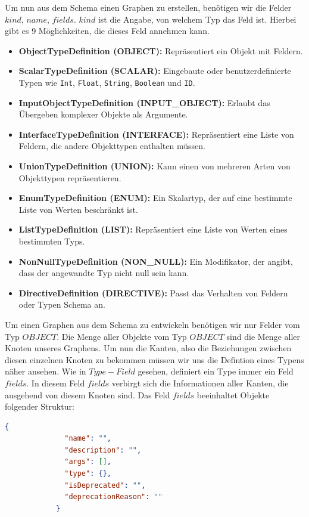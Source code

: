 Um nun aus dem Schema einen Graphen zu erstellen, benötigen wir die Felder $kind$, $name$, $fields$.
$kind$ ist die Angabe, von welchem Typ das Feld ist.
Hierbei gibt es 9 Möglichkeiten, die dieses Feld annehmen kann.

\begin{itemize}
    \item \textbf{ObjectTypeDefinition (OBJECT):} Repräsentiert ein Objekt mit Feldern.
    \item \textbf{ScalarTypeDefinition (SCALAR):} Eingebaute oder benutzerdefinierte Typen wie \texttt{Int}, \texttt{Float}, \texttt{String}, \texttt{Boolean} und \texttt{ID}.
    \item \textbf{InputObjectTypeDefinition (INPUT\_OBJECT):} Erlaubt das Übergeben komplexer Objekte als Argumente.
    \item \textbf{InterfaceTypeDefinition (INTERFACE):} Repräsentiert eine Liste von Feldern, die andere Objekttypen enthalten müssen.
    \item \textbf{UnionTypeDefinition (UNION):} Kann einen von mehreren Arten von Objekttypen repräsentieren.
    \item \textbf{EnumTypeDefinition (ENUM):} Ein Skalartyp, der auf eine bestimmte Liste von Werten beschränkt ist.
    \item \textbf{ListTypeDefinition (LIST):} Repräsentiert eine Liste von Werten eines bestimmten Typs.
    \item \textbf{NonNullTypeDefinition (NON\_NULL):} Ein Modifikator, der angibt, dass der angewandte Typ nicht null sein kann.
    \item \textbf{DirectiveDefinition (DIRECTIVE):} Passt das Verhalten von Feldern oder Typen  Schema an.
\end{itemize}

Um einen Graphen aus dem Schema zu entwickeln benötigen wir nur Felder vom Typ $OBJECT$.
Die Menge aller Objekte vom Typ $OBJECT$ sind die Menge aller Knoten unseres Graphens.
Um nun die Kanten, also die Beziehungen zwischen diesen einzelnen Knoten zu bekommen müssen wir uns die Defintion
eines Typens näher ansehen.
Wie in $Type-Field$ gesehen, definiert ein Type immer ein Feld $fields$.
In diesem Feld $fields$ verbirgt sich die Informationen aller Kanten, die ausgehend von diesem Knoten sind.
Das Feld $fields$ beeinhaltet Objekte folgender Struktur:

\begin{lstlisting}[language=json, caption={Type-Field},captionpos=b]
            {
              "name": "",
              "description": "",
              "args": [],
              "type": {},
              "isDeprecated": "",
              "deprecationReason": ""
            }
\end{lstlisting}

